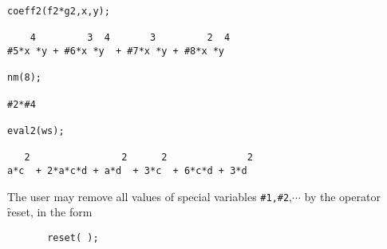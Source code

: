 \begin{verbatim}
coeff2(f2*g2,x,y);

    4         3  4       3         2  4
#5*x *y + #6*x *y  + #7*x *y + #8*x *y

nm(8);

#2*#4

eval2(ws);

   2                2      2              2
a*c  + 2*a*c*d + a*d  + 3*c  + 6*c*d + 3*d

\end{verbatim}
The user may remove all values of special variables \verb|#1,#2|,$\cdots$
by the operator \hypertarget{operator:RESET}{}\f{reset}, in the form
\begin{verbatim}
       reset( );
\end{verbatim}

